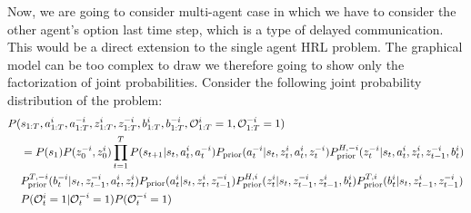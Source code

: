 \label{sec:chap4-multi-soft-HRL-communication}
Now, we are going to consider multi-agent case in which we have to consider the other agent's option last time step, which is a type of delayed communication. This would be a direct extension to the single agent HRL problem. The graphical model can be too complex to draw we therefore going to show only the factorization of joint probabilities. Consider the following joint probability distribution of the problem:
\begin{equation}
\begin{aligned}
    P(&s_{1:T}, a^i_{1:T}, a^{-i}_{1:T}, z^i_{1:T}, z^{-i}_{1:T}, b^i_{1:T}, b^{-i}_{1:T}, \mathcal{O}^i_{1:T} = 1, \mathcal{O}^{-i}_{1:T} = 1) \\
    &= P(s_1)P(z^{-i}_0, z^i_0)\prod^T_{t=1} P(s_{t+1} | s_t, a_t^i, a_t^{-i})P_{\text{prior}}(a^{-i}_t | s_t, z^i_t, a^i_t, z^{-i}_t) P^{H,-i}_{\text{prior}}(z^{-i}_t | s_t, a^i_t, z^i_t, z^{-i}_{t-1}, b^i_t) \\
    &P^{T,-i}_{\text{prior}}(b^{-i}_t | s_t,  z^{-i}_{t-1}, a^i_t, z^i_t) P_{\text{prior}}(a^i_t | s_t, z^i_t, z^{-i}_{t-1}) P^{H,i}_{\text{prior}}(z^i_t | s_t, z^{-i}_{t-1}, z^i_{t-1}, b^i_t) P^{T,i}_{\text{prior}}(b^i_t | s_t, z^i_{t-1}, z^{-i}_{t-1})\\
    &P(\mathcal{O}^i_t = 1 | \mathcal{O}^{-i}_t = 1)P(\mathcal{O}^{-i}_t = 1)
\end{aligned}
\end{equation}
